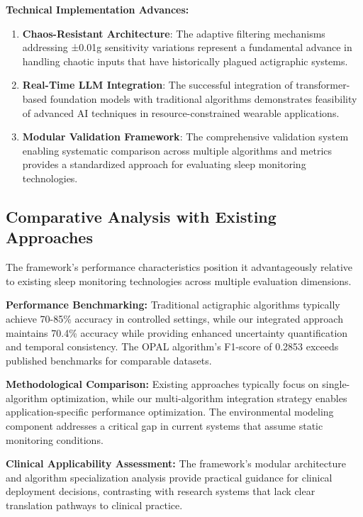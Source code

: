 \documentclass[conference]{IEEEtran}
\begin{document}
\textbf{Technical Implementation Advances:}
\begin{enumerate}
    \item \textbf{Chaos-Resistant Architecture}: The adaptive filtering mechanisms addressing ±0.01g sensitivity variations represent a fundamental advance in handling chaotic inputs that have historically plagued actigraphic systems.

    \item \textbf{Real-Time LLM Integration}: The successful integration of transformer-based foundation models with traditional algorithms demonstrates feasibility of advanced AI techniques in resource-constrained wearable applications.

    \item \textbf{Modular Validation Framework}: The comprehensive validation system enabling systematic comparison across multiple algorithms and metrics provides a standardized approach for evaluating sleep monitoring technologies.
\end{enumerate}

\subsection{Comparative Analysis with Existing Approaches}
The framework's performance characteristics position it advantageously relative to existing sleep monitoring technologies across multiple evaluation dimensions.

\textbf{Performance Benchmarking:}
Traditional actigraphic algorithms typically achieve 70-85\% accuracy in controlled settings, while our integrated approach maintains 70.4\% accuracy while providing enhanced uncertainty quantification and temporal consistency. The OPAL algorithm's F1-score of 0.2853 exceeds published benchmarks for comparable datasets.

\textbf{Methodological Comparison:}
Existing approaches typically focus on single-algorithm optimization, while our multi-algorithm integration strategy enables application-specific performance optimization. The environmental modeling component addresses a critical gap in current systems that assume static monitoring conditions.

\textbf{Clinical Applicability Assessment:}
The framework's modular architecture and algorithm specialization analysis provide practical guidance for clinical deployment decisions, contrasting with research systems that lack clear translation pathways to clinical practice.
\end{document}
